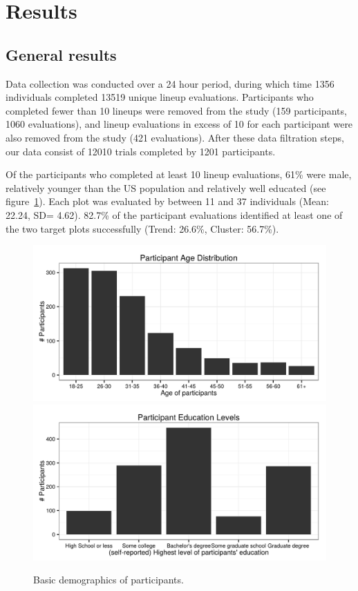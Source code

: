 \documentclass[11pt]{isuthesis}\usepackage[]{graphicx}\usepackage[]{color}
\newenvironment{knitrout}{}{} %
\begin{document}
\section{Results}\label{sec:Results}


\subsection{General results}
Data collection was conducted over a 24 hour period, 
during which time 1356 individuals completed 13519 unique lineup evaluations. 
Participants who completed fewer than 10 lineups were removed from the study (159 participants, 1060 evaluations), and lineup evaluations in excess of 10 for each participant were also removed from the study (421 evaluations). 
After these data filtration steps, our data consist of 12010 trials completed by 1201 participants. 

Of the participants who completed at least 10 lineup evaluations, 61\% were male, relatively younger than the US population and relatively well educated (see figure~\ref{fig:demographics}). 
Each plot was evaluated by between 11 and 37 individuals 
(Mean: 22.24, SD= 4.62).
82.7\% of the participant evaluations identified at least one of the two target plots successfully (Trend: 26.6\%, Cluster: 56.7\%). 

\begin{figure}[ht]
\begin{knitrout}
\color{fgcolor}

{\centering \includegraphics[width=.48\linewidth]{Figure/FeatureHierarchy/fig-demographics-1} 
\includegraphics[width=.48\linewidth]{Figure/FeatureHierarchy/fig-demographics-2} 

}



\end{knitrout}
\caption{\label{fig:demographics}Basic demographics of participants.}
\end{figure}
\end{document}
